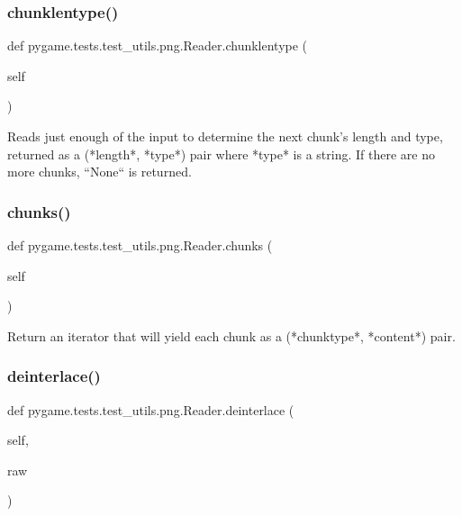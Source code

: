 \subsubsection{\texorpdfstring{chunklentype()}{chunklentype()}}
{\footnotesize\ttfamily def pygame.\+tests.\+test\+\_\+utils.\+png.\+Reader.\+chunklentype (\begin{DoxyParamCaption}\item[{}]{self }\end{DoxyParamCaption})}

\begin{DoxyVerb}Reads just enough of the input to determine the next
chunk's length and type, returned as a (*length*, *type*) pair
where *type* is a string.  If there are no more chunks, ``None``
is returned.
\end{DoxyVerb}
 \mbox{\label{classpygame_1_1tests_1_1test__utils_1_1png_1_1_reader_aa3f8b0fd5a7557c049ee0718f33b9def}} 
\subsubsection{\texorpdfstring{chunks()}{chunks()}}
{\footnotesize\ttfamily def pygame.\+tests.\+test\+\_\+utils.\+png.\+Reader.\+chunks (\begin{DoxyParamCaption}\item[{}]{self }\end{DoxyParamCaption})}

\begin{DoxyVerb}Return an iterator that will yield each chunk as a
(*chunktype*, *content*) pair.
\end{DoxyVerb}
 \mbox{\label{classpygame_1_1tests_1_1test__utils_1_1png_1_1_reader_a6918a60b5484ac0742bfff1e883c8151}} 
\subsubsection{\texorpdfstring{deinterlace()}{deinterlace()}}
{\footnotesize\ttfamily def pygame.\+tests.\+test\+\_\+utils.\+png.\+Reader.\+deinterlace (\begin{DoxyParamCaption}\item[{}]{self,  }\item[{}]{raw }\end{DoxyParamCaption})}

